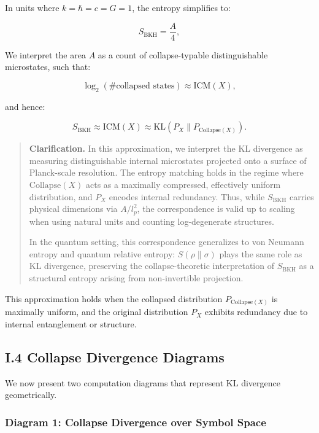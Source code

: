 \documentclass[11pt]{article}
\begin{document}
In units where \( k = \hbar = c = G = 1 \), the entropy simplifies to:

\[
S_{\mathrm{BKH}} = \frac{A}{4},
\]

We interpret the area \( A \) as a count of collapse-typable distinguishable microstates, such that:

\[
\log_2(\# \text{collapsed states}) \approx \mathrm{ICM}(X),
\]

and hence:

\[
S_{\mathrm{BKH}} \approx \mathrm{ICM}(X) \approx \mathrm{KL}(P_X \parallel P_{\mathrm{Collapse}(X)}).
\]

\begin{quote}
\textbf{Clarification.} In this approximation, we interpret the KL divergence as measuring distinguishable internal microstates projected onto a surface of Planck-scale resolution. The entropy matching holds in the regime where $\mathrm{Collapse}(X)$ acts as a maximally compressed, effectively uniform distribution, and $P_X$ encodes internal redundancy. Thus, while $S_{\mathrm{BKH}}$ carries physical dimensions via $A/l_p^2$, the correspondence is valid up to scaling when using natural units and counting log-degenerate structures.

In the quantum setting, this correspondence generalizes to von Neumann entropy and quantum relative entropy: $S(\rho \| \sigma)$ plays the same role as KL divergence, preserving the collapse-theoretic interpretation of $S_{\mathrm{BKH}}$ as a structural entropy arising from non-invertible projection.
\end{quote}



This approximation holds when the collapsed distribution \( P_{\mathrm{Collapse}(X)} \) is maximally uniform, and the original distribution \( P_X \) exhibits redundancy due to internal entanglement or structure.


\subsection*{I.4 Collapse Divergence Diagrams}

We now present two computation diagrams that represent KL divergence geometrically.

\subsubsection*{Diagram 1: Collapse Divergence over Symbol Space}
\end{document}
